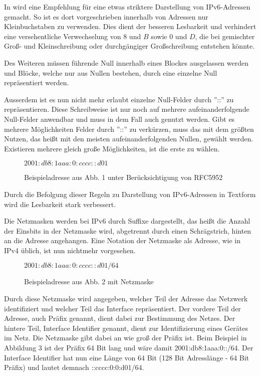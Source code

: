 \documentclass[a4paper, 12pt]{scrartcl}
\begin{document}
In \cite{rfc5952} wird eine Empfehlung für eine etwas striktere Darstellung von IPv6-Adressen gemacht.
So ist es dort vorgeschrieben innerhalb von Adressen nur Kleinbuchstaben zu verwenden. Dies dient der besseren Lesbarkeit und verhindert eine versehentliche Verwechselung von $8$ und $B$ sowie $0$ und $D$, die bei gemischter Groß- und Kleinschreibung oder durchgängiger Großschreibung entstehen könnte.

Des Weiteren müssen führende Null innerhalb eines Blockes ausgelassen werden und Blöcke, welche nur aus Nullen bestehen, durch eine einzelne Null repräsentiert werden.

Ausserdem ist es nun nicht mehr erlaubt einzelne Null-Felder durch ''::'' zu repräsentieren. 
Diese Schreibweise ist nur noch auf mehrere aufeinanderfolgende Null-Felder anwendbar und muss in dem Fall auch genutzt werden.
Gibt es mehrere Möglichkeiten Felder durch ''::'' zu verkürzen, muss das mit dem größten Nutzen, das heißt mit den meisten aufeinanderfolgenden Nullen, gewählt werden. 
Existieren mehrere gleich große Möglichkeiten, ist die erste zu wählen.


\begin{figure}[h]
	\centering
	$2001:db8:1aaa:0:cccc::d01$
	\caption{Beispieladresse aus Abb. 1 unter Berücksichtigung von RFC5952}
\end{figure}

Durch die Befolgung dieser Regeln zu Darstellung von IPv6-Adressen in Textform wird die Lesbarkeit stark verbessert.

Die Netzmasken werden bei IPv6 durch Suffixe dargestellt, das heißt die Anzahl der Einsbits in der Netzmaske wird, abgetrennt durch einen Schrägstrich, hinten an die Adresse angehangen.
Eine Notation der Netzmaske als Adresse, wie in IPv4 üblich, ist nun nichtmehr vorgesehen.


\begin{figure}[h]
	\centering
	$2001:db8:1aaa:0:cccc::d01/64$
	\caption{Beispieladresse aus Abb. 2 mit Netzmaske}
\end{figure}

Durch diese Netzmaske wird angegeben, welcher Teil der Adresse das Netzwerk identifiziert und welcher Teil das Interface repräsentiert. Der vordere Teil der Adresse, auch Präfix genannt, dient dabei zur Bestimmung des Netzes.
Der hintere Teil, Interface Identifier genannt, dient zur Identifizierung eines Gerätes im Netz. Die Netzmaske gibt dabei an wie groß der Präfix ist.
Beim Beispiel in Abbildung 3 ist der Präfix 64 Bit lang und wäre damit 2001:db8:1aaa:0::/64. Der Interface Identifier hat nun eine Länge von 64 Bit (128 Bit Adresslänge - 64 Bit Präfix) und lautet demnach ::cccc:0:0:d01/64.
\end{document}
